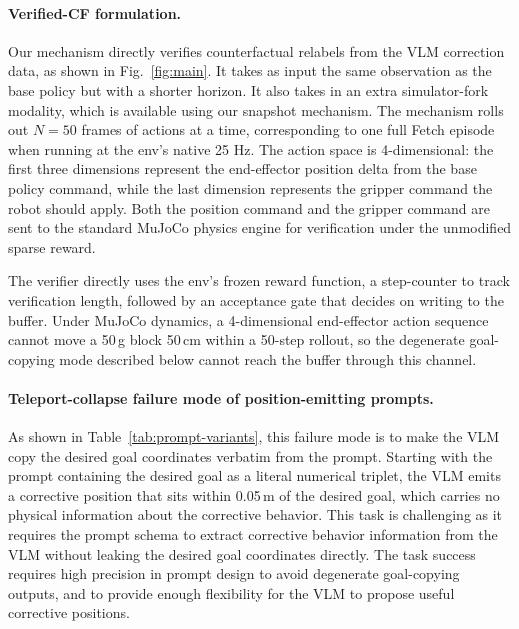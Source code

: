 \documentclass{article}
\begin{document}
\paragraph{Verified-CF formulation.}
Our mechanism directly verifies counterfactual relabels from the
VLM correction data, as shown in Fig.~\ref{fig:main}. It takes as
input the same observation as the base policy but with a shorter
horizon. It also takes in an extra simulator-fork modality, which
is available using our snapshot mechanism. The mechanism rolls out
$N\!=\!50$ frames of actions at a time, corresponding to one full
Fetch episode when running at the env's native 25 Hz. The action
space is 4-dimensional: the first three dimensions represent the
end-effector position delta from the base policy command, while the
last dimension represents the gripper command the robot should
apply. Both the position command and the gripper command are sent
to the standard MuJoCo \citep{todorov2012mujoco} physics engine for
verification under the unmodified sparse reward.

The verifier directly uses the env's frozen reward function, a
step-counter to track verification length, followed by an
acceptance gate that decides on writing to the buffer. Under MuJoCo
dynamics, a 4-dimensional end-effector action sequence cannot move
a 50\,g block 50\,cm within a 50-step rollout, so the degenerate
goal-copying mode described below cannot reach the buffer through
this channel.

\paragraph{Teleport-collapse failure mode of position-emitting
prompts.}
As shown in Table~\ref{tab:prompt-variants}, this failure mode is
to make the VLM copy the desired goal coordinates verbatim from
the prompt. Starting with the prompt containing the desired goal
as a literal numerical triplet, the VLM emits a corrective
position that sits within 0.05\,m of the desired goal, which
carries no physical information about the corrective behavior.
This task is challenging as it requires the prompt schema to
extract corrective behavior information from the VLM without
leaking the desired goal coordinates directly. The task success
requires high precision in prompt design to avoid degenerate
goal-copying outputs, and to provide enough flexibility for the
VLM to propose useful corrective positions.
\end{document}
